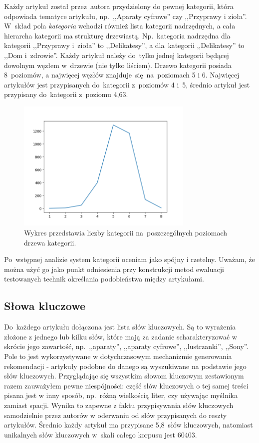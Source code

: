\documentclass[pl]{minipw} %
\begin{document}
Każdy artykuł został przez~autora przydzielony do pewnej kategorii, która odpowiada tematyce artykułu, np.~,,Aparaty cyfrowe'' czy ,,Przyprawy i zioła''. W~skład pola \textit{kategoria} wchodzi również lista kategorii nadrzędnych, a cała hierarcha kategorii ma strukturę drzewiastą. Np.~kategoria nadrzędna dla kategorii ,,Przyprawy i~zioła'' to ,,Delikatesy'', a dla~kategorii ,,Delikatesy'' to ,,Dom i~zdrowie''. Każdy artykuł należy do~tylko jednej kategorii będącej dowolnym węzłem w~drzewie (nie tylko liściem). Drzewo kategorii posiada 8~poziomów, a najwięcej węzłów znajduje~się na~poziomach 5 i 6. Najwięcej artykułów jest przypisanych do~kategorii z~poziomów 4 i~5, średnio artykuł jest przypisany do~kategorii z~poziomu 4,63.
\begin{figure}[H]
	\centering
	\includegraphics[width=0.75\textwidth]{img/categories_levels.png}
	\caption{Wykres przedstawia liczby kategorii na~poszczególnych poziomach drzewa kategorii.}
\end{figure}
Po~wstępnej analizie system kategorii oceniam jako spójny i rzetelny. Uważam, że można użyć go jako punkt odniesienia przy konstrukcji metod ewaluacji testowanych technik określania podobieństwa między artykułami.
\subsection{Słowa kluczowe}
Do~każdego artykułu dołączona jest lista słów kluczowych. Są to wyrażenia złożone z jednego lub kilku słów, które mają za zadanie scharakteryzować w skrócie jego zawartość, np.~,,aparaty'', ,,aparaty cyfrowe'', ,,lustrzanki'', ,,Sony''. Pole to jest wykorzystywane w dotychczasowym mechanizmie generowania rekomendacji - artykuły podobne do danego są wyszukiwane na podstawie jego słów kluczowych. Przyglądając się wszystkim słowom kluczowym zestawionym razem zauważyłem pewne niespójności: część słów kluczowych o tej samej treści pisana jest w inny sposób, np.~różną wielkością liter, czy używając myślnika zamiast spacji. Wynika to zapewne z faktu przypisywania słów kluczowych samodzielnie przez autorów w oderwaniu od słów przypisanych do reszty artykułów. Średnio każdy artykuł ma przypisane 5,8~słów kluczowych, natomiast unikalnych słów kluczowych w~skali całego korpusu jest 60403.
\end{document}
